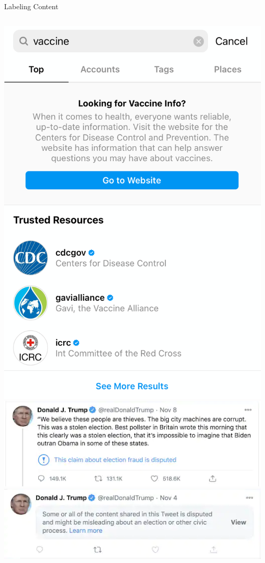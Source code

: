 \documentclass[nobackground,dvipsnames,table,aspectratio=169]{beamer}
\begin{document}
\begin{frame}{Labeling Content}
    \begin{columns}
            \includegraphics[width=\textwidth]{labeling-content-search}
            \includegraphics[width=\textwidth]{labeling-content-trump-1}
            \includegraphics[width=\textwidth]{labeling-content-trump-2}
    \end{columns}
\end{frame}
\end{document}
